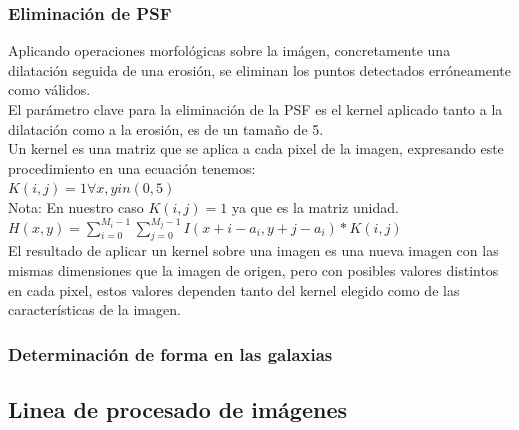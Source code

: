 	\subsubsection{Eliminación de PSF}
    Aplicando operaciones morfológicas sobre la imágen, concretamente una dilatación seguida de una erosión, se eliminan los puntos detectados erróneamente como válidos.
    \\
    El parámetro clave para la eliminación de la PSF es el kernel aplicado tanto a la dilatación como a la erosión, es de un tamaño de 5.
    \\
    Un kernel es una matriz que se aplica a cada pixel de la imagen, expresando este procedimiento en una ecuación tenemos:\\ \newline
    $ K(i,j) = 1 \forall x,y in (0,5)$\\ \newline
    \scriptsize Nota: En nuestro caso $K(i,j)=1$ ya que es la matriz unidad.\\ \newline
    $ H(x,y) = \sum_{i=0}^{M_{i}-1}\sum_{j=0}^{M_{j}-1}I(x+i-a_{i},y+j-a_{i})*K(i,j) $
	\\
	El resultado de aplicar un kernel sobre una imagen es una nueva imagen con las mismas dimensiones que la imagen de origen, pero con posibles valores distintos en cada pixel, estos valores dependen tanto del kernel elegido como de las características de la imagen.
	\\
	\subsubsection{Determinación de forma en las galaxias}

	\subsection{Linea de procesado de imágenes}
